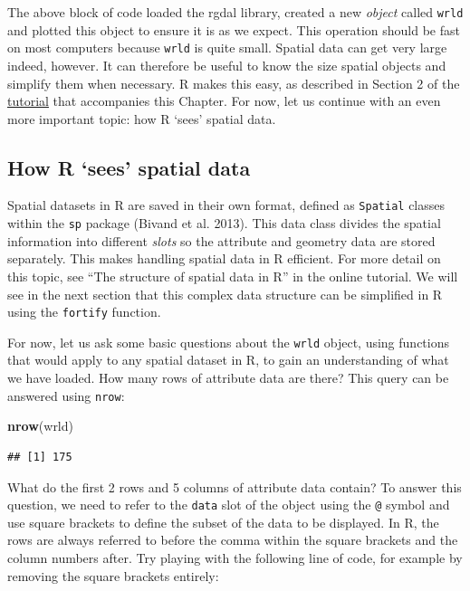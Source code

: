 \documentclass[]{article}
\newenvironment{Shaded}{}{}
\newcommand{\KeywordTok}[1]{\textcolor[rgb]{0.00,0.44,0.13}{\textbf{{#1}}}}
\newcommand{\NormalTok}[1]{{#1}}
\begin{document}
The above block of code loaded the rgdal library, created a new
\emph{object} called \texttt{wrld} and plotted this object to ensure it
is as we expect. This operation should be fast on most computers because
\texttt{wrld} is quite small. Spatial data can get very large indeed,
however. It can therefore be useful to know the size spatial objects and
simplify them when necessary. R makes this easy, as described in Section
2 of the
\href{https://github.com/geocomPP/sdvwR/blob/master/sdv-tutorial.pdf?raw=true}{tutorial}
that accompanies this Chapter. For now, let us continue with an even
more important topic: how R `sees' spatial data.

\subsection{How R `sees' spatial data}

Spatial datasets in R are saved in their own format, defined as
\texttt{Spatial} classes within the \texttt{sp} package (Bivand et al.
2013). This data class divides the spatial information into different
\emph{slots} so the attribute and geometry data are stored separately.
This makes handling spatial data in R efficient. For more detail on this
topic, see ``The structure of spatial data in R'' in the online
tutorial. We will see in the next section that this complex data
structure can be simplified in R using the \texttt{fortify} function.

For now, let us ask some basic questions about the \texttt{wrld} object,
using functions that would apply to any spatial dataset in R, to gain an
understanding of what we have loaded. How many rows of attribute data
are there? This query can be answered using \texttt{nrow}:

\begin{Shaded}
\begin{Highlighting}[]
\KeywordTok{nrow}\NormalTok{(wrld)}
\end{Highlighting}
\end{Shaded}

\begin{verbatim}
## [1] 175
\end{verbatim}

What do the first 2 rows and 5 columns of attribute data contain? To
answer this question, we need to refer to the \texttt{data} slot of the
object using the \texttt{@} symbol and use square brackets to define the
subset of the data to be displayed. In R, the rows are always referred
to before the comma within the square brackets and the column numbers
after. Try playing with the following line of code, for example by
removing the square brackets entirely:
\end{document}
